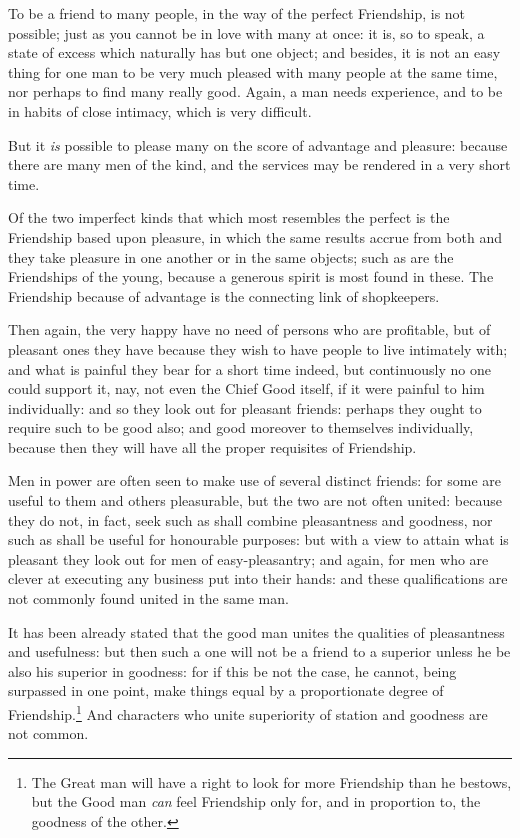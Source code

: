 To be a friend to many people, in the way of the perfect Friendship, is not
possible; just as you cannot be in love with many at once: it is, so to speak,
a state of excess which naturally has but one object; and besides, it is not an
easy thing for one man to be very much pleased with many people at the same
time, nor perhaps to find many really good. Again, a man needs experience, and
to be in habits of close intimacy, which is very difficult.

But it \emph{is} possible to please many on the score of advantage and
pleasure: because there are many men of the kind, and the services may be
rendered in a very short time.

Of the two imperfect kinds that which most resembles the perfect is the
Friendship based upon pleasure, in which the same results accrue from both and
they take pleasure in one another or in the same objects; such as are the
Friendships of the young, because a generous spirit is most found in these. The
Friendship because of advantage is the connecting link of shopkeepers.

Then again, the very happy have no need of persons who are profitable, but of
pleasant ones they have because they wish to have people to live intimately
with; and what is painful they bear for a short time indeed, but continuously
no one could support it, nay, not even the Chief Good itself, if it were
painful to him individually: and so they look out for pleasant friends: perhaps
they ought to require such to be good also; and good moreover to themselves
individually, because then they will have all the proper requisites of
Friendship.

Men in power are often seen to make use of several distinct friends: for some
are useful to them and others pleasurable, but the two are not often united:
because they do not, in fact, seek such as shall combine pleasantness and
goodness, nor such as shall be useful for honourable purposes: but with a view
to attain what is pleasant they look out for men of easy-pleasantry; and again,
for men who are clever at executing any business put into their hands: and
these qualifications are not commonly found united in the same man.

It has been already stated that the good man unites the qualities of
pleasantness and usefulness: but then such a one will not be a friend to a
superior unless he be also his superior in goodness: for if this be not the
case, he cannot, being surpassed in one point, make things equal by a
proportionate degree of Friendship.\footnote{The Great man will have a right to look for more Friendship than he bestows,
but the Good man \emph{can} feel Friendship only for, and in proportion to, the
goodness of the other.}
And characters who unite superiority of station and goodness are not common.

